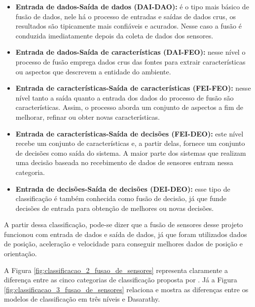 \documentclass[acronym, symbols, table, deposito]{fei}
\begin{document}
				\begin{itemize}
					\item \textbf{Entrada de dados-Saída de dados (DAI-DAO):} é o tipo mais básico de fusão de dados, nele há o processo de entradas e saídas de dados crus, os resultados são tipicamente mais confiáveis e acurados. Nesse caso a fusão é conduzida imediatamente depois da coleta de dados dos sensores.
					
					\item \textbf{Entrada de dados-Saída de características (DAI-FEO):} nesse nível o processo de fusão emprega dados crus das fontes para extrair características ou aspectos que descrevem a entidade do ambiente.
					
					\item \textbf{Entrada de características-Saída de características (FEI-FEO):} nesse nível tanto a saída quanto a entrada dos dados do processo de fusão são características. Assim, o processo aborda um conjunto de aspectos a fim de melhorar, refinar ou obter novas características.
					
					\item \textbf{Entrada de características-Saída de decisões (FEI-DEO):} este nível recebe um conjunto de características e, a partir delas, fornece um conjunto de decisões como saída do sistema. A maior parte dos sistemas que realizam uma decisão baseada no recebimento de dados de sensores entram nessa categoria.
					
					\item \textbf{Entrada de decisões-Saída de decisões (DEI-DEO):} esse tipo de classificação é também conhecida como fusão de decisão, já que funde decisões de entrada para obtenção de melhores ou novas decisões.
				\end{itemize}
				
				A partir dessa classificação, pode-se dizer que a fusão de sensores desse projeto funcionou com entrada de dados e saída de dados, já que foram utilizados dados de posição, aceleração e velocidade para conseguir melhores dados de posição e orientação.
				
				A Figura \ref{fig:classificacao_2_fusao_de_sensores} representa claramente a diferença entre as cinco categorias de classificação proposta por \textcite{dasarathy1997sensor}. Já a Figura \ref{fig:classificacao_3_fusao_de_sensores} relaciona e mostra as diferenças entre os modelos de classificação em três níveis e Dasarathy.
			
\end{document}
